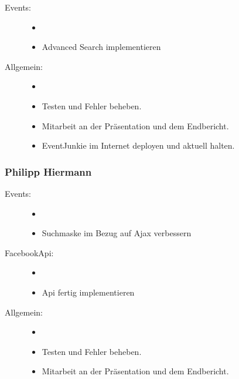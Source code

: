 \documentclass{article}
\begin{document}
\begin{description}
    \item[Events:]
        \begin{itemize}
        \item[]
            \item Advanced Search implementieren
        \end{itemize}

    \item[Allgemein:]
        \begin{itemize}
        \item[]
            \item Testen und Fehler beheben.
            \item Mitarbeit an der Präsentation und dem Endbericht.
            \item EventJunkie im Internet deployen und aktuell halten.
        \end{itemize}
\end{description}


\subsubsection{Philipp Hiermann}

\begin{description}
    \item[Events:]
        \begin{itemize}
        \item[]
            \item Suchmaske im Bezug auf Ajax verbessern
        \end{itemize}
        
    \item[FacebookApi:]
        \begin{itemize}
        \item[]
            \item Api fertig implementieren
        \end{itemize}

    \item[Allgemein:]
        \begin{itemize}
        \item[]
            \item Testen und Fehler beheben.
            \item Mitarbeit an der Präsentation und dem Endbericht.
        \end{itemize}
\end{description}






%
%
\end{document}

